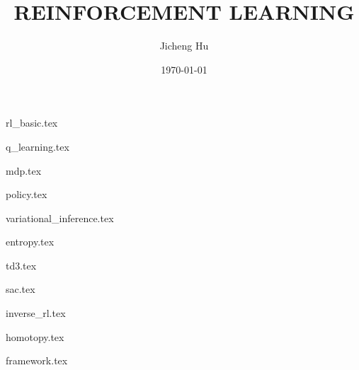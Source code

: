 \documentclass{book}
\title{REINFORCEMENT LEARNING}
\author{Jicheng Hu}
\date{\today}
\begin{document}
\frontmatter	%


\tableofcontents

\thispagestyle{empty}
\mainmatter		%

\begin{spacing}{1.0}    %

\setcounter{page}{1}


\def\allfiles{}

\ifx\allfiles\undefined
\else
{rl_basic.tex}
\fi

\ifx\allfiles\undefined
\else
{q_learning.tex}
\fi

\ifx\allfiles\undefined
\else
{mdp.tex}
\fi

\ifx\allfiles\undefined
\else
{policy.tex}
\fi

\ifx\allfiles\undefined
\else
{variational_inference.tex}
\fi

\ifx\allfiles\undefined
\else
{entropy.tex}
\fi

\ifx\allfiles\undefined
\else
{td3.tex}
\fi

\ifx\allfiles\undefined
\else
{sac.tex}
\fi

\ifx\allfiles\undefined
\else
{inverse_rl.tex}
\fi

\ifx\allfiles\undefined
\else
{homotopy.tex}
\fi

\ifx\allfiles\undefined
\else
{framework.tex}
\fi


\end{spacing}
\end{document}

